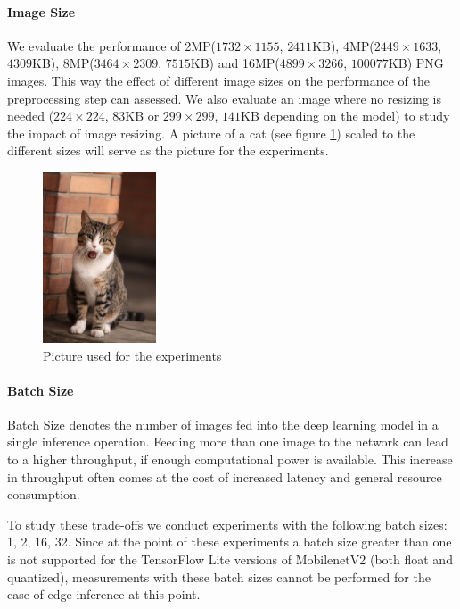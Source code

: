 \paragraph{Image Size}
We evaluate the performance of 2MP($1732\times1155$, $2411$KB), 4MP($2449\times1633$, $4309$KB), 8MP($3464\times2309$, $7515$KB) and 16MP($4899\times3266$, $100077$KB) PNG images. This way the effect of different image sizes on the performance of the preprocessing step can assessed. We also evaluate an image where no resizing is needed ($224\times224$, $83$KB or $299\times299$, $141$KB depending on the model) to study the impact of image resizing. A picture of a cat (see figure \ref{fig:cat}) scaled to the different sizes will serve as the picture for the experiments.
\begin{figure}[H]
\centering
\includegraphics[width=0.3\textwidth]{./Bilder/European_cat_02_16_mp.jpg}
\caption{Picture used for the experiments \cite{cat}}
\label{fig:cat}
\end{figure}
\paragraph{Batch Size}
Batch Size denotes the number of images fed into the deep learning model in a single inference operation. 
Feeding more than one image to the network can lead to a higher throughput, if enough computational power is available. This increase in throughput often comes at the cost of increased latency and general resource consumption.

To study these trade-offs we conduct experiments with the following batch sizes: 1, 2, 16, 32. Since at the point of these experiments a batch size greater than one is not supported for the TensorFlow Lite versions of MobilenetV2 (both float and quantized), measurements with these batch sizes cannot be performed for the case of edge inference at this point.
